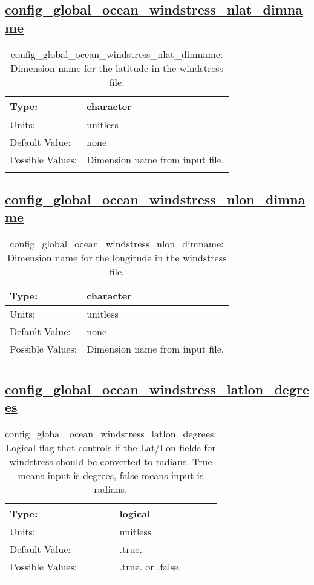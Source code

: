 \subsection[config\_global\_ocean\_windstress\_nlat\_dimname]{\hyperref[sec:nm_tab_global_ocean]{config\_global\_ocean\_windstress\_nlat\_dimname}}
\label{subsec:nm_sec_config_global_ocean_windstress_nlat_dimname}
\begin{center}
\begin{longtable}{| p{2.0in} || p{4.0in} |}
    \hline
    Type: & character \\
    \hline
    Units: & \si{unitless} \\
    \hline
    Default Value: & none \\
    \hline
    Possible Values: & Dimension name from input file. \\
    \hline
    \caption{config\_global\_ocean\_windstress\_nlat\_dimname: Dimension name for the latitude in the windstress file.}
\end{longtable}
\end{center}
\subsection[config\_global\_ocean\_windstress\_nlon\_dimname]{\hyperref[sec:nm_tab_global_ocean]{config\_global\_ocean\_windstress\_nlon\_dimname}}
\label{subsec:nm_sec_config_global_ocean_windstress_nlon_dimname}
\begin{center}
\begin{longtable}{| p{2.0in} || p{4.0in} |}
    \hline
    Type: & character \\
    \hline
    Units: & \si{unitless} \\
    \hline
    Default Value: & none \\
    \hline
    Possible Values: & Dimension name from input file. \\
    \hline
    \caption{config\_global\_ocean\_windstress\_nlon\_dimname: Dimension name for the longitude in the windstress file.}
\end{longtable}
\end{center}
\subsection[config\_global\_ocean\_windstress\_latlon\_degrees]{\hyperref[sec:nm_tab_global_ocean]{config\_global\_ocean\_windstress\_latlon\_degrees}}
\label{subsec:nm_sec_config_global_ocean_windstress_latlon_degrees}
\begin{center}
\begin{longtable}{| p{2.0in} || p{4.0in} |}
    \hline
    Type: & logical \\
    \hline
    Units: & \si{unitless} \\
    \hline
    Default Value: & .true. \\
    \hline
    Possible Values: & .true. or .false. \\
    \hline
    \caption{config\_global\_ocean\_windstress\_latlon\_degrees: Logical flag that controls if the Lat/Lon fields for windstress should be converted to radians. True means input is degrees, false means input is radians.}
\end{longtable}
\end{center}
